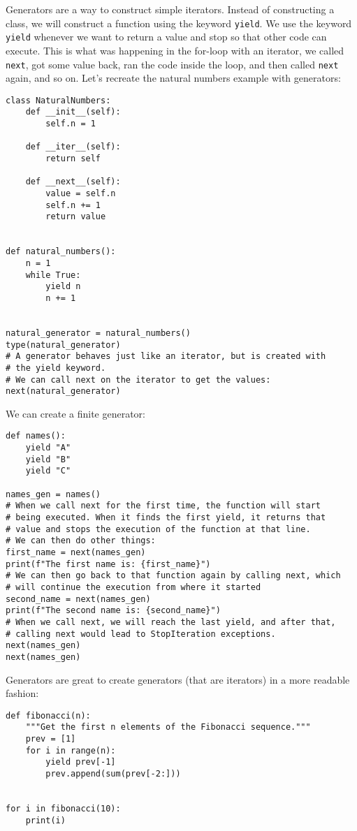 \documentclass[12pt, a4paper]{article}
\begin{document}
Generators are a way to construct simple iterators.
Instead of constructing a class, we will construct a function using the keyword \texttt{yield}.
We use the keyword \texttt{yield} whenever we want to return a value and stop so that other code can execute.
This is what was happening in the for-loop with an iterator, we called \texttt{next}, got some value back, ran the code inside the loop, and then called \texttt{next} again, and so on.
Let's recreate the natural numbers example with generators:
\lstset{language=jupyter-python,label= ,caption= ,captionpos=b,numbers=none}
\begin{lstlisting}
class NaturalNumbers:
    def __init__(self):
        self.n = 1

    def __iter__(self):
        return self

    def __next__(self):
        value = self.n
        self.n += 1
        return value


def natural_numbers():
    n = 1
    while True:
        yield n
        n += 1


natural_generator = natural_numbers()
type(natural_generator)
# A generator behaves just like an iterator, but is created with
# the yield keyword.
# We can call next on the iterator to get the values:
next(natural_generator)
\end{lstlisting}

We can create a finite generator:
\lstset{language=jupyter-python,label= ,caption= ,captionpos=b,numbers=none}
\begin{lstlisting}
def names():
    yield "A"
    yield "B"
    yield "C"

names_gen = names()
# When we call next for the first time, the function will start
# being executed. When it finds the first yield, it returns that
# value and stops the execution of the function at that line.
# We can then do other things:
first_name = next(names_gen)
print(f"The first name is: {first_name}")
# We can then go back to that function again by calling next, which
# will continue the execution from where it started
second_name = next(names_gen)
print(f"The second name is: {second_name}")
# When we call next, we will reach the last yield, and after that,
# calling next would lead to StopIteration exceptions.
next(names_gen)
next(names_gen)
\end{lstlisting}

Generators are great to create generators (that are iterators) in a more readable fashion:
\lstset{language=jupyter-python,label= ,caption= ,captionpos=b,numbers=none}
\begin{lstlisting}
def fibonacci(n):
    """Get the first n elements of the Fibonacci sequence."""
    prev = [1]
    for i in range(n):
        yield prev[-1]
        prev.append(sum(prev[-2:]))


for i in fibonacci(10):
    print(i)
\end{lstlisting}
\end{document}

